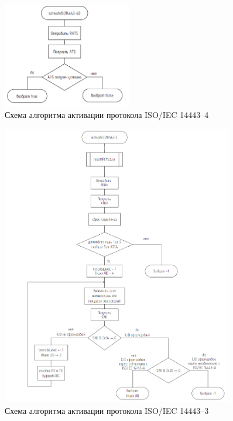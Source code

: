 \begin{figure}[H]
    \centering
    \includegraphics[width=0.5\textwidth]{images/design/activate_iso4}
    \caption{\centering Схема алгоритма активации протокола ISO/IEC 14443--4}
    \label{fig:activate_iso4}
\end{figure}

\begin{figure}[H]
    \centering
    \includegraphics[width=0.9\textwidth]{images/design/activate_iso3}
    \caption{\centering Схема алгоритма активации протокола ISO/IEC 14443--3}
    \label{fig:activate_iso3}
\end{figure}

